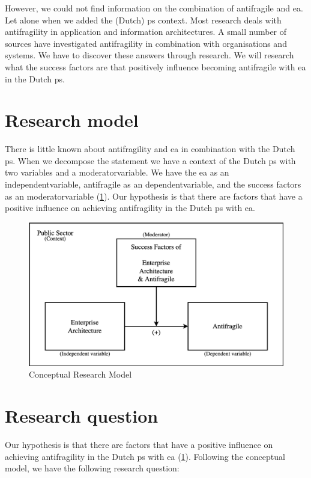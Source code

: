 However, we could not find information on the combination of \gls{antifragile} and \acrlong{ea}. Let alone when we added the (Dutch) \gls{ps} context. Most research deals with \gls{antifragility} in application and information architectures. A small number of sources have investigated \gls{antifragility} in combination with organisations and systems. We have to discover these answers through research. We will research what the success factors are that positively influence becoming \gls{antifragile} with \acrlong{ea} in the Dutch \gls{ps}.

\section{Research model}
\label{sec:conceptualmodel}
There is little known about \gls{antifragility} and \acrlong{ea} in combination with the Dutch \gls{ps}.  When we decompose the statement we have a context of the Dutch \gls{ps} with two variables and a \gls{moderatorvariable}. We have the \acrlong{ea} as an \gls{independentvariable}, \gls{antifragile} as an \gls{dependentvariable}, and the success factors as an \gls{moderatorvariable} (\cref{fig:conceptualmodel}). Our hypothesis is that there are factors that have a positive influence on achieving \gls{antifragility} in the Dutch \gls{ps} with \acrlong{ea}.
\begin{figure}[H]
	\centering
	\includegraphics[width=0.7\linewidth]{images/conceptualmodel}
	\caption[Conceptual Research Model]{Conceptual Research Model}
	\label{fig:conceptualmodel}
\end{figure}

\section{Research question}
\label{sec:introresearchquestion}
Our hypothesis is that there are factors that have a positive influence on achieving \gls{antifragility} in the Dutch \gls{ps} with \acrlong{ea} (\cref{fig:conceptualmodel}). Following the conceptual model, we have the following research question:


